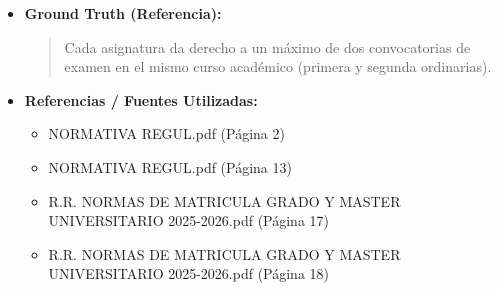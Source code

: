 \documentclass[12pt,a4paper,oneside]{report}
\begin{document}
\begin{itemize}
\begin{itemize}
\begin{quote}
Sin embargo, para los estudiantes que se matriculen por primera vez en una asignatura, solo podrán presentarse a las \textbf{dos convocatorias posteriores} a la finalización del periodo lectivo de la misma.

Además, existe una excepción para los estudiantes que tengan pendientes de superar menos del 10\% de los créditos totales, excluidos los créditos asignados al trabajo fin de carrera y a las prácticas externas. En este caso, una de las convocatorias, a elección del estudiante, tendrá la consideración de \textbf{convocatoria extraordinaria}.

Es importante tener en cuenta que el calendario específico de convocatorias de exámenes finales se establecerá en el Calendario Académico aprobado anualmente por el Consejo de Gobierno de la Universidad de Sevilla. 

No se proporcionan fechas concretas para el curso académico 2025-2026 en el contexto dado.
                \end{quote}
          \item \textbf{{Ground Truth (Referencia):}} \\
                \begin{quote}
Cada asignatura da derecho a un máximo de dos convocatorias de examen en el mismo curso académico (primera y segunda ordinarias).
                \end{quote}
          \item \textbf{{Referencias / Fuentes Utilizadas:}} \\
                \begin{itemize}
                  \item NORMATIVA REGUL.pdf (Página 2)
                  \item NORMATIVA REGUL.pdf (Página 13)
                  \item R.R. NORMAS DE MATRICULA GRADO Y MASTER UNIVERSITARIO 2025-2026.pdf (Página 17)
                  \item R.R. NORMAS DE MATRICULA GRADO Y MASTER UNIVERSITARIO 2025-2026.pdf (Página 18)
                \end{itemize}
        \end{itemize}


\end{itemize}
\end{document}
